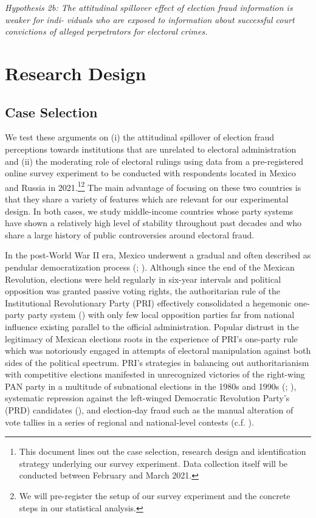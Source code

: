 \documentclass[11pt, ngerman,english,a4]{article}
\begin{document}
\indent \textit{Hypothesis 2b: The attitudinal spillover effect of election fraud information is weaker for indi- \indent viduals who are exposed to information about successful court convictions of alleged perpetrators \indent for electoral crimes.}

\section*{Research Design}

\subsection*{Case Selection}

We test these arguments on (i) the attitudinal spillover of election fraud perceptions towards institutions that are unrelated to electoral administration and (ii) the moderating role of electoral rulings using data from a pre-registered online survey experiment to be conducted with respondents located in Mexico and Russia in 2021.\footnote{This document lines out the case selection, research design and identification strategy underlying our survey experiment. Data collection itself will be conducted between February and March 2021.}\footnote{We will pre-register the setup of our survey experiment and the concrete steps in our statistical analysis.} The main advantage of focusing on these two countries is that they share a variety of features which are relevant for our experimental design. In both cases, we study middle-income countries whose party systems have shown a relatively high level of stability throughout past decades and who share a large history of public controversies around electoral fraud. 

In the post-World War II era, Mexico underwent a gradual and often described as pendular democratization process (\citealt{Cantu2015}; \citealt{Hiskey2005}). Although since the end of the Mexican Revolution, elections were held regularly in six-year intervals and political opposition was granted passive voting rights, the authoritarian rule of the Institutional Revolutionary Party (PRI) effectively consolidated a hegemonic one-party party system (\citealt{Sartori1976}) with only few local opposition parties far from national influence existing parallel to the official administration. Popular distrust in the legitimacy of Mexican elections roots in the experience of PRI’s one-party rule which was notoriously engaged in attempts of electoral manipulation against both sides of the political spectrum. PRI’s strategies in balancing out authoritarianism with competitive elections manifested in unrecognized victories of the right-wing PAN party in a multitude of subnational elections in the 1980s and 1990s (\citealt{Greene2007}; \citealt{Cantu2015}), systematic repression against the left-winged Democratic Revolution Party’s (PRD) candidates (\citealt{Greene2007}), and election-day fraud such as the manual alteration of vote tallies in a series of regional and national-level contests (c.f. \citealt{Cantu2019b}).
\end{document}

